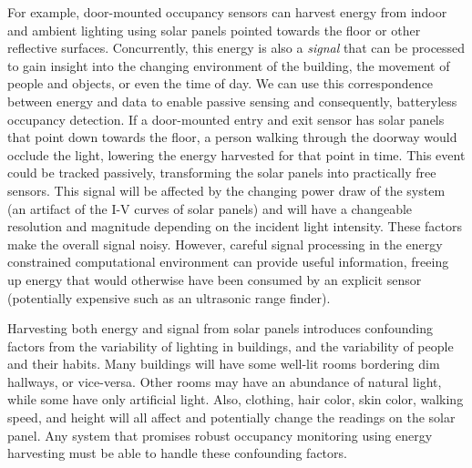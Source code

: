 For example, door-mounted occupancy sensors can harvest energy from indoor and ambient lighting using solar panels pointed towards the floor or other reflective surfaces.
Concurrently, this energy is also a \textit{signal} that can be processed to gain insight into the changing environment of the building, the movement of people and objects, or even the time of day.
We can use this correspondence between energy and data to enable passive sensing and consequently, batteryless occupancy detection.
If a door-mounted entry and exit sensor has solar panels that point down towards the floor, a person walking through the doorway would occlude the light, lowering the energy harvested for that point in time.
This event could be tracked passively, transforming the solar panels into practically free sensors.
This signal will be affected by the changing power draw of the system (an artifact of the I-V curves of solar panels) and will have a changeable resolution and magnitude depending on the incident light intensity.
These factors make the overall signal noisy.
However, careful signal processing in the energy constrained computational environment can provide useful information, freeing up energy that would otherwise have been consumed by an explicit sensor (potentially expensive such as an ultrasonic range finder).

Harvesting both energy and signal from solar panels introduces confounding factors from the variability of lighting in buildings, and the variability of people and their habits.
Many buildings will have some well-lit rooms bordering dim hallways, or vice-versa.
Other rooms may have an abundance of natural light, while some have only artificial light.
Also, clothing, hair color, skin color, walking speed, and height will all affect  and potentially change the readings on the solar panel.
Any system that promises robust occupancy monitoring using energy harvesting must be able to handle these  confounding factors.







